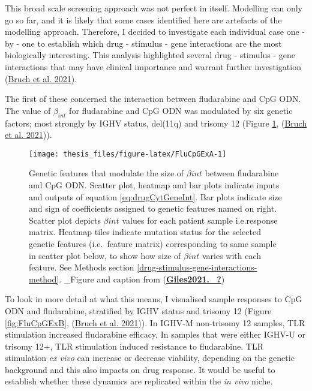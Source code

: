 \documentclass[11pt, a4paper, twosided]{book}
\begin{document}
This broad scale screening approach was not perfect in itself. Modelling can only go so far, and it is likely that some cases identified here are artefacts of the modelling approach. Therefore, I decided to investigate each individual case one - by - one to establish which drug - stimulus - gene interactions are the most biologically interesting. This analysis highlighted several drug - stimulus - gene interactions that may have clinical importance and warrant further investigation (\protect\hyperlink{ref-Giles2021}{Bruch et al. 2021}).

The first of these concerned the interaction between fludarabine and CpG ODN. The value of \(\beta_{int}\) for fludarabine and CpG ODN was modulated by six genetic factors; most strongly by IGHV status, del(11q) and trisomy 12 (Figure \ref{fig:FluCpGExA}, (\protect\hyperlink{ref-Giles2021}{Bruch et al. 2021})).


\begin{figure}

{\centering \texttt{[image: thesis\_files/figure-latex/FluCpGExA-1]} 

}

\caption{Genetic features that modulate the size of \(\beta{int}\) between fludarabine and CpG ODN. Scatter plot, heatmap and bar plots indicate inputs and outputs of equation \eqref{eq:drugCytGeneInt}. Bar plots indicate size and sign of coefficients assigned to genetic features named on right. Scatter plot depicts \(\beta{int}\) values for each patient sample i.e.response matrix. Heatmap tiles indicate mutation status for the selected genetic features (i.e.~feature matrix) corresponding to same sample in scatter plot below, to show how size of \(\beta{int}\) varies with each feature. See Methods section \ref{drug-stimulus-gene-interactions-method}. \_Figure and caption from (\protect\hyperlink{ref-Giles2021._}{\textbf{Giles2021.\_?}})}\label{fig:FluCpGExA}
\end{figure}
To look in more detail at what this means, I visualised sample responses to CpG ODN and fludarabine, stratified by IGHV status and trisomy 12 (Figure \ref{fig:FluCpGExB}, (\protect\hyperlink{ref-Giles2021}{Bruch et al. 2021})). In IGHV-M non-trisomy 12 samples, TLR stimulation increased fludarabine efficacy. In samples that were either IGHV-U or trisomy 12+, TLR stimulation induced resistance to fludarabine. TLR stimulation \emph{ex vivo} can increase or decrease viability, depending on the genetic background and this also impacts on drug response. It would be useful to establish whether these dynamics are replicated within the \emph{in vivo} niche.
\end{document}
